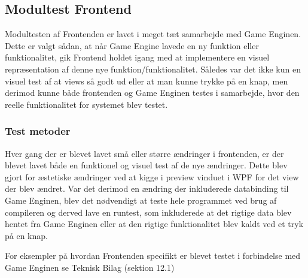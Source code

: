 \subsection{Modultest Frontend}
Modultesten af Frontenden er lavet i meget tæt samarbejde med Game Enginen. Dette er valgt sådan, at når Game Engine lavede en ny funktion eller funktionalitet, gik Frontend holdet igang med at implementere en visuel repræsentation af denne nye funktion/funktionalitet. Således var det ikke kun en visuel test af at views så godt ud eller at man kunne trykke på en knap, men derimod kunne både frontenden og Game Enginen testes i samarbejde, hvor den reelle funktionalitet for systemet blev testet.

\subsubsection{Test metoder}
Hver gang der er blevet lavet små eller større ændringer i frontenden, er der blevet lavet både en funktionel og visuel test af de nye ændringer. Dette blev gjort for æstetiske ændringer ved at kigge i preview vinduet i WPF for det view der blev ændret. Var det derimod en ændring der inkluderede databinding til Game Enginen, blev det nødvendigt at teste hele programmet ved brug af compileren og derved lave en runtest, som inkluderede at det rigtige data blev hentet fra Game Enginen eller at den rigtige funktionalitet blev kaldt ved et tryk på en knap.

\noindent For eksempler på hvordan Frontenden specifikt er blevet testet i forbindelse med Game Enginen se Teknisk Bilag (sektion 12.1)